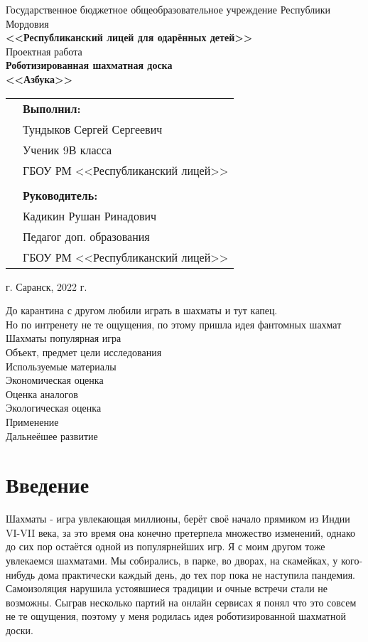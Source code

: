 \documentclass[a4paper]{article}
\begin{document}
  \thispagestyle{empty}
  \begin{center}
    Государственное бюджетное общеобразовательное учреждение Республики Мордовия\\\textbf{<<Республиканский лицей для одарённых детей>>}\\
    \hfill \break
    \hfill \break
    \hfill \break
    \hfill \break
    \hfill \break
    Проектная работа\\
    \textbf{Роботизированная шахматная доска\\<<Азбука>>}
  \end{center}
  \hfill \break
  \hfill \break
  \hfill \break
  \hfill \break
  \hfill \break
  \hfill \break
  \hfill \break
  \hfill \break
  \hfill \break
  \hfill \break
  \begin{tabular}{p{6.1cm}l}
     &\textbf{Выполнил:}\\
     &Тундыков Сергей Сергеевич\\
     &Ученик 9В класса\\
     &ГБОУ РМ <<Республиканский лицей>>\\
     & \\
     &\textbf{Руководитель:}\\
     &Кадикин Рушан Ринадович\\
     &Педагог доп. образования\\
     &ГБОУ РМ <<Республиканский лицей>>\\
  \end{tabular}
  \hfill \break
  \hfill \break
  \begin{center}
    г. Саранск, 2022 г.
  \end{center}
  \newpage
  \tableofcontents
  \newpage
  До карантина с другом любили играть в шахматы и тут капец. \\
  Но по интренету не те ощущения, по этому пришла идея фантомных шахмат \\
  Шахматы популярная игра \\ 
  Объект, предмет цели исследования \\ 
  Используемые материалы \\ 
  Экономическая оценка \\ 
  Оценка аналогов \\ 
  Экологическая оценка \\ 
  Применение \\ 
  Дальнеёшее развитие
  \newpage

  \section{Введение}
  Шахматы - игра увлекающая миллионы, берёт своё начало прямиком из Индии VI-VII века, за это время она конечно претерпела множество изменений, однако до сих пор остаётся одной из популярнейших игр. Я с моим другом тоже увлекаемся шахматами. Мы собирались, в парке, во дворах, на скамейках, у кого-нибудь дома практически каждый день, до тех пор пока не наступила пандемия. Самоизоляция нарушила устоявшиеся традиции и очные встречи стали не возможны. Сыграв несколько партий на онлайн сервисах я понял что это совсем не те ощущения, поэтому у меня родилась идея роботизированной шахматной доски.
  
\end{document}
